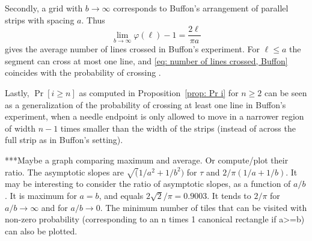 \documentclass[12pt, a4paper]{article}
\newcommand{\funt}{\tau} %
\newcommand{\funta}{\varphi} %
\newcommand{\len}{\ell} %
\newcommand{\touched}{visited}
\begin{document}
Secondly, a grid with $b \rightarrow \infty$ corresponds to Buffon's arrangement of parallel strips with spacing $a$. Thus
\begin{equation}
\label{eq: number of lines crossed, Buffon}
\lim_{b \rightarrow \infty} \funta(\len)-1 = \frac{2\len}{\pi a}
\end{equation}
gives the average number of lines crossed in Buffon's experiment. For $\len \leq a$ the segment can cross at most one line, and \eqref{eq: number of lines crossed, Buffon} coincides with the probability of crossing \cite[section 1.1]{Mathai99}.

Lastly, $\Pr[i \geq n]$ as computed in Proposition~\ref{prop: Pr i} for $n \geq 2$ can be seen as a generalization of the probability of crossing at least one line in Buffon's experiment, when a needle endpoint is only allowed to move in a narrower region of width $n-1$ times smaller than the width of the strips (instead of across the full strip as in Buffon's setting).

***Maybe a graph comparing maximum and average. Or compute/plot their ratio. The asymptotic slopes are $\sqrt(1/a^2+1/b^2)$ for $\funt$ and $2/\pi(1/a+1/b)$. It may be interesting to consider the ratio of asymptotic slopes, as a function of $a/b$. It is maximum for $a=b$, and equals $2\sqrt 2/\pi = 0.9003$. It tends to $2/\pi$ for $a/b \rightarrow \infty$ and for $a/b \rightarrow 0$. The minimum number of tiles that can be \touched{} with non-zero probability (corresponding to an n times 1 canonical rectangle if a>=b) can also be plotted.




\end{document}
